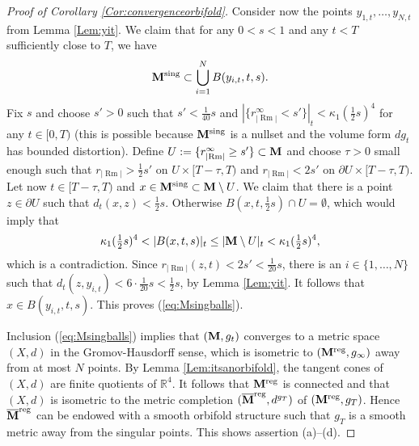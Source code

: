 \documentclass[11pt]{amsart}
\numberwithin{equation}{section}
\newcommand{\IR}{\mathbb{R}}
\def\M{{\bf M}}
\DeclareMathOperator{\Rm}{Rm}
\newcommand{\rrm}{r_{|{\Rm}|}}
\numberwithin{equation}{section}
\begin{document}
\begin{proof}[Proof of Corollary \ref{Cor:convergenceorbifold}]
Consider now the points $y_{1,t}, \ldots, y_{N, t}$ from Lemma \ref{Lem:yit}.
We claim that for any $0 < s < 1$ and any $t < T$ sufficiently close to $T$, we have
\begin{equation} \label{eq:Msingballs}
 \M^{\textnormal{sing}} \subset \bigcup_{i=1}^N B(y_{i,t}, t, s).
\end{equation}
Fix $s$ and choose $s' > 0$ such that $s' < \frac1{40} s$ and $| \{ \rrm^\infty < s' \} |_t < \kappa_1 (\tfrac1{2} s)^4$ for any $t \in [0,T)$ (this is possible because $\M^{\textnormal{sing}}$ is a nullset and the volume form $dg_t$ has bounded distortion).
Define $U := \{ \rrm^\infty \geq s' \} \subset \M$ and choose $\tau > 0$ small enough such that $\rrm > \frac12 s'$ on $U \times [T-\tau, T)$ and $\rrm < 2s'$ on $\partial U \times [T-\tau, T)$.
Let now $t \in [T-\tau, T)$ and $x \in \M^{\textnormal{sing}} \subset \M \setminus U$.
We claim that there is a point $z \in \partial U$ such that $d_t (x,z) < \frac1{2} s$.
Otherwise $B(x, t, \tfrac1{2} s) \cap U = \emptyset$, which would imply that
\[ \kappa_1 (\tfrac1{2} s)^4 < | B(x,t,s) |_t \leq | \M \setminus U |_t < \kappa_1 (\tfrac1{2} s)^4, \]
which is a contradiction.
Since $\rrm (z,t) < 2 s' < \tfrac1{20} s$, there is an $i \in \{ 1, \ldots, N \}$ such that $d_t (z, y_{i,t}) <  6 \cdot \frac{1}{20} s < \frac1{2} s$, by Lemma \ref{Lem:yit}.
It follows that $x \in B(y_{i,t}, t, s)$.
This proves (\ref{eq:Msingballs}).

Inclusion (\ref{eq:Msingballs}) implies that $(\M, g_t)$ converges to a metric space $(X, d)$ in the Gromov-Hausdorff sense, which is isometric to $(\M^{\textnormal{reg}}, g_\infty)$ away from at most $N$ points.
By Lemma \ref{Lem:itsanorbifold}, the tangent cones of $(X,d)$ are finite quotients of $\IR^4$.
It follows that $\M^{\textnormal{reg}}$ is connected and that $(X,d)$ is isometric to the metric completion $(\overline{\M}^{\textnormal{reg}}, d^{g_T})$ of $(\M^{\textnormal{reg}}, g_T)$.
Hence $\overline{\M}^{\textnormal{reg}}$ can be endowed with a smooth orbifold structure such that $g_T$ is a smooth metric away from the singular points.
This shows assertion (a)--(d).


\end{proof}
\end{document}
